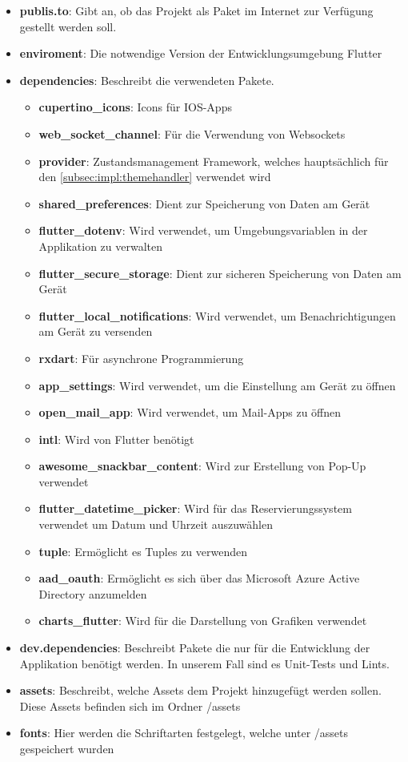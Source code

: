 \begin{itemize}
    \item \textbf{publis.to}: Gibt an, ob das Projekt als Paket im Internet zur Verfügung gestellt werden soll.
    \item \textbf{enviroment}: Die notwendige Version der Entwicklungsumgebung Flutter
    \item \textbf{dependencies}: Beschreibt die verwendeten Pakete.
    \begin{itemize}
        \item \textbf{cupertino\_icons}: Icons für IOS-Apps
        \item \textbf{web\_socket\_channel}: Für die Verwendung von Websockets
        \item \textbf{provider}: Zustandsmanagement Framework, welches hauptsächlich für den \ref{subsec:impl:themehandler}   verwendet wird 
        \item \textbf{shared\_preferences}: Dient zur Speicherung von Daten am Gerät
        \item \textbf{flutter\_dotenv}: Wird verwendet, um Umgebungsvariablen in der Applikation zu verwalten
        \item \textbf{flutter\_secure\_storage}: Dient zur sicheren Speicherung von Daten am Gerät
        \item \textbf{flutter\_local\_notifications}: Wird verwendet, um Benachrichtigungen am Gerät zu versenden
        \item \textbf{rxdart}: Für asynchrone Programmierung
        \item \textbf{app\_settings}: Wird verwendet, um die Einstellung am Gerät zu öffnen
        \item \textbf{open\_mail\_app}: Wird verwendet, um Mail-Apps zu öffnen
        \item \textbf{intl}: Wird von Flutter benötigt
        \item \textbf{awesome\_snackbar\_content}: Wird zur Erstellung von Pop-Up verwendet
        \item \textbf{flutter\_datetime\_picker}: Wird für das Reservierungssystem verwendet um Datum und Uhrzeit auszuwählen
        \item \textbf{tuple}: Ermöglicht es Tuples zu verwenden
        \item \textbf{aad\_oauth}: Ermöglicht es sich über das Microsoft Azure Active Directory anzumelden
        \item \textbf{charts\_flutter}: Wird für die Darstellung von Grafiken verwendet
    \end{itemize}
    \item \textbf{dev.dependencies}: Beschreibt Pakete die nur für die Entwicklung der Applikation benötigt werden. In unserem Fall sind es Unit-Tests und Lints.
    \item \textbf{assets}: Beschreibt, welche Assets dem Projekt hinzugefügt werden sollen. Diese Assets befinden sich im Ordner {\textit{}{/assets}}
    \item \textbf{fonts}: Hier werden die Schriftarten festgelegt, welche unter {\textit{}{/assets}} gespeichert wurden
\end{itemize}

